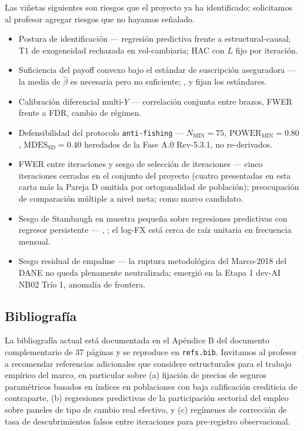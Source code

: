 \documentclass[11pt,a4paper]{article}
\theoremstyle{plain}
\begin{document}
Las viñetas siguientes son riesgos que el proyecto ya ha identificado; solicitamos al profesor agregar riesgos que no hayamos señalado.

\begin{itemize}
  \item Postura de identificación --- regresión predictiva frente a estructural-causal; T1 de exogeneidad rechazada en vol-cambiaria; HAC con \(L\) fijo por iteración.
  \item Suficiencia del payoff convexo bajo el estándar de suscripción aseguradora --- la media de \(\hat{\beta}\) es necesaria pero no suficiente; \citet{carter_etal_2017}, \citet{mahul_stutley_2010} y \citet{clarke_2016} fijan los estándares.
  \item Calibración diferencial multi-\(Y\) --- correlación conjunta entre brazos, FWER frente a FDR, cambio de régimen.
  \item Defensibilidad del protocolo \texttt{anti-fishing} --- \(N_{\mathrm{MIN}}=75\), \(\mathrm{POWER}_{\mathrm{MIN}}=0.80\), \(\mathrm{MDES}_{\mathrm{SD}}=0.40\) heredados de la Fase A.0 Rev-5.3.1, no re-derivados.
  \item FWER entre iteraciones y sesgo de selección de iteraciones --- cinco iteraciones cerradas en el conjunto del proyecto (cuatro presentadas en esta carta más la Pareja D omitida por ortogonalidad de población); preocupación de comparación múltiple a nivel meta; \citet{heckman_1979} como marco candidato.
  \item Sesgo de Stambaugh en muestra pequeña sobre regresiones predictivas con regresor persistente --- \citet{stambaugh1999}, \citet{phillips2014}; el log-FX está cerca de raíz unitaria en frecuencia mensual.
  \item Sesgo residual de empalme --- la ruptura metodológica del Marco-2018 del DANE no queda plenamente neutralizada; emergió en la Etapa 1 dev-AI NB02 Trío 1, anomalía de frontera.
\end{itemize}

\subsection{Bibliografía}\label{sec:4-bib}

La bibliografía actual está documentada en el Apéndice B del documento complementario de 37 páginas y se reproduce en \texttt{refs.bib}. Invitamos al profesor a recomendar referencias adicionales que considere estructurales para el trabajo empírico del marco, en particular sobre (a) fijación de precios de seguros paramétricos basados en índices en poblaciones con baja calificación crediticia de contraparte, (b) regresiones predictivas de la participación sectorial del empleo sobre paneles de tipo de cambio real efectivo, y (c) regímenes de corrección de tasa de descubrimientos falsos entre iteraciones para pre-registro observacional.
\end{document}

